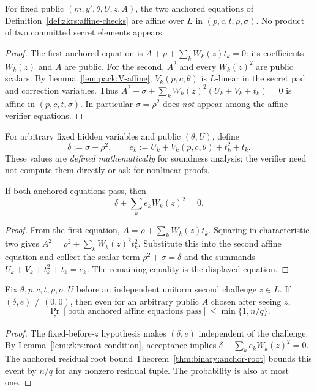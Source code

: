\begin{lemma}\label{lem:zkrs:anchor-affine}
For fixed public $(m,y',\theta,U,z,A)$,
the two anchored equations of
Definition~\ref{def:zkrs:affine-checks}
are affine over $L$ in $(p,c,t,\rho,\sigma)$.
No product of two committed secret elements appears.
\end{lemma}
\begin{proof}
The first anchored equation is
$A+\rho+\sum_kW_k(z)t_k=0$:
its coefficients $W_k(z)$ and $A$ are public.
For the second, $A^2$ and every $W_k(z)^2$
are public scalars. By
Lemma~\ref{lem:pack:V-affine},
$V_k(p,c,\theta)$ is $L$-linear in the
secret pad and correction variables.
Thus
$A^2+\sigma+\sum_kW_k(z)^2(U_k+V_k+t_k)=0$
is affine in $(p,c,t,\sigma)$.
In particular $\sigma=\rho^2$
does \emph{not} appear among the
affine verifier equations.
\end{proof}

\begin{definition}\label{def:zkrs:errors}
For arbitrary fixed hidden variables and public $(\theta,U)$,
define
\[
 \delta:=\sigma+\rho^2,\qquad
 e_k:=U_k+V_k(p,c,\theta)+t_k^2+t_k.
\]
These values are \emph{defined mathematically}
for soundness analysis; the verifier need not
compute them directly or ask for nonlinear proofs.
\end{definition}

\begin{lemma}\label{lem:zkrs:root-condition}
If both anchored equations pass, then
\[
 \boxed{\delta+\sum_ke_kW_k(z)^2=0.}
\]
\end{lemma}
\begin{proof}
From the first equation,
$A=\rho+\sum_kW_k(z)t_k$.
Squaring in characteristic two gives
$A^2=\rho^2+\sum_kW_k(z)^2t_k^2$.
Substitute this into the second affine equation
and collect the scalar term
$\rho^2+\sigma=\delta$
and the summands
$U_k+V_k+t_k^2+t_k=e_k$.
The remaining equality is the displayed equation.
\end{proof}

\begin{theorem}\label{thm:zkrs:residual-detection}
Fix $\theta,p,c,t,\rho,\sigma,U$ before
an independent uniform second challenge $z\in L$.
If $(\delta,e)\neq(0,0)$, then
even for an arbitrary public $A$ chosen after seeing $z$,
\[
 \Pr_z[\text{both anchored affine equations pass}]
 \leq\min\{1,n/q\}.
\]
\end{theorem}
\begin{proof}
The fixed-before-$z$ hypothesis makes
$(\delta,e)$ independent of the challenge.
By Lemma~\ref{lem:zkrs:root-condition},
acceptance implies
$\delta+\sum_ke_kW_k(z)^2=0$.
The anchored residual root bound
Theorem~\ref{thm:binary:anchor-root}
bounds this event by $n/q$ for any
nonzero residual tuple. The probability
is also at most one.
\end{proof}

